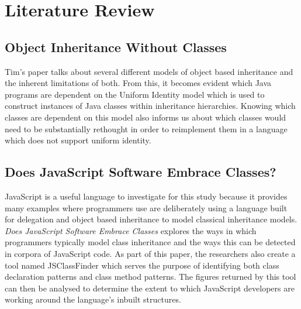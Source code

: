 \chapter{Literature Review}\label{C:us}

\section{Object Inheritance Without Classes~\cite{InheritanceWithoutClasses}}
Tim's paper talks about several different models of object based inheritance and the inherent limitations of both. From this, it becomes evident which Java programs are dependent on the Uniform Identity model which is used to construct instances of Java classes within inheritance hierarchies. Knowing which classes are dependent on this model also informs us about which classes would need to be substantially rethought in order to reimplement them in a language which does not support uniform identity. 

\section{Does JavaScript Software Embrace Classes?~\cite{JSClassFinder}}
JavaScript is a useful language to investigate for this study because it provides many examples where programmers use are deliberately using a language built for delegation and object based inheritance to model classical inheritance models. \textit{Does JavaScript Software Embrace Classes} explores the ways in which programmers typically model class inheritance and the ways this can be detected in corpora of JavaScript code. As part of this paper, the researchers also create a tool named JSClassFinder which serves the purpose of identifying both class declaration patterns and class method patterns. The figures returned by this tool can then be analysed to determine the extent to which JavaScript developers are working around the language's inbuilt structures.

